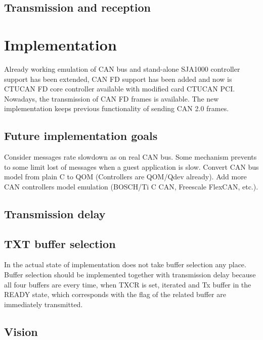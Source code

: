 \documentclass{ctuthesis}
\begin{document}
 \subsection{Transmission and reception}

 \section{Implementation}
  Already working emulation of CAN bus and stand-alone SJA1000 controller support has been extended, CAN FD support has been added and now is CTUCAN FD core controller available with modified card CTUCAN PCI. Nowadays, the transmission of CAN FD frames is available. The new implementation keeps previous functionality of sending CAN 2.0 frames.

 \subsection{Future implementation goals}
  Consider messages rate slowdown as on real CAN bus. Some mechanism prevents to some limit lost of messages when a guest application is slow. Convert CAN bus model from plain C to QOM (Controllers are QOM/Qdev already). Add more CAN controllers model emulation (BOSCH/Ti C CAN, Freescale FlexCAN, etc.).
 
 \subsection{Transmission delay}
 
 \subsection{TXT buffer selection}
  In the actual state of implementation does not take buffer selection any place. Buffer selection should be implemented together with transmission delay because all four buffers are every time, when TXCR is set, iterated and Tx buffer in the READY state, which corresponds with the flag of the related buffer are immediately transmitted.
 
 \subsection{Vision}
 
\end{document}
